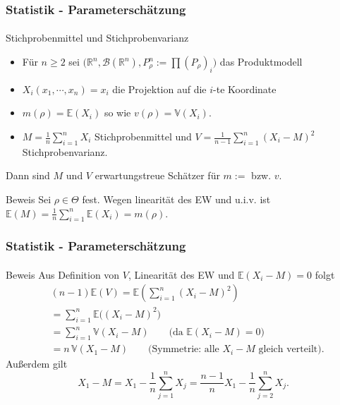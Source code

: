 \documentclass{beamer}
\begin{document}
\begin{frame}
    \frametitle{Statistik - Parameterschätzung}
\framesubtitle{}
\begin{block}{Stichprobenmittel und  Stichprobenvarianz}
\begin{itemize}
\item Für $n \geq 2$ sei  $\biggl ( \mathbb{R}^n, \mathcal{B}(\mathbb{R}^n ), P^n_\rho :=  \prod (P_\rho)_i \biggr)$ das Produktmodell
\item $X_i(x_1, \cdots , x_n) = x_i$ die Projektion auf die $i$-te Koordinate  
\item $m(\rho) =  \mathbb{E}(X_i) $ so wie $v(\rho) =\mathbb{V}(X_i)$. 
\item  $M= \frac{1}{n} \sum_{i=1}^n X_i$ Stichprobenmittel  und $V= \frac{1}{n-1} \sum_{i=1}^n (X_i - M)^2$ Stichprobenvarianz.
\end{itemize}

 Dann sind $M$  und $V$ erwartungstreue Schätzer für $m:=$ bzw. $v$.

\end{block}

\begin{block}{Beweis}
Sei $\rho \in \Theta$ fest. Wegen linearität des EW und u.i.v. ist $\mathbb{E}(M) =\frac{1}{n} \sum_{i=1}^n \mathbb{E}(X_i) = m(\rho) $.
\end{block}


 \end{frame}


\begin{frame}
    \frametitle{Statistik - Parameterschätzung}
\framesubtitle{}

\begin{block}{Beweis}
Aus Definition von $V$, Linearität des EW und $\mathbb{E}(X_i - M) = 0$ folgt
\begin{align*}
&(n-1) \mathbb{E}(V)
= \mathbb{E}\!\left(\sum_{i=1}^n (X_i-M)^2\right) \\
&= \sum_{i=1}^n \mathbb{E}\big((X_i-M)^2\big) \\
&= \sum_{i=1}^n \mathbb{V}(X_i-M)
\qquad \text{(da $\mathbb{E}(X_i-M)=0$)} \\
&= n\,\mathbb{V}(X_1-M)
\qquad \text{(Symmetrie: alle $X_i-M$ gleich verteilt).}
\end{align*}
Außerdem gilt
\[
X_1-M = X_1-\frac{1}{n}\sum_{j=1}^n X_j
= \frac{n-1}{n}X_1 - \frac{1}{n}\sum_{j=2}^n X_j.
\]
\end{block}


 \end{frame}
\end{document}
